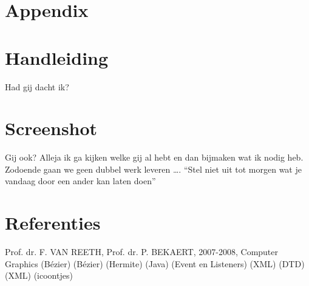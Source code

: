 \documentclass[a4paper,11pt,oneside, titlepage]{article}
\begin{document}
\section{Appendix}
\appendix
\section{Handleiding}
Had gij dacht ik?
\section{Screenshot}
Gij ook? Alleja ik ga kijken welke gij al hebt en dan bijmaken wat ik nodig heb. Zodoende gaan
we geen dubbel werk leveren \ldots. ``Stel niet uit tot morgen wat je vandaag door een ander
kan laten doen''
\section{Referenties}
Prof. dr. F. VAN REETH, Prof. dr. P. BEKAERT, 2007-2008, Computer Graphics
 (B\'ezier)
 (B\'ezier)
 (Hermite)
 (Java)
 (Event en Listeners)
 (XML)
 (DTD)
 (XML)
 (icoontjes)
\end{document}
